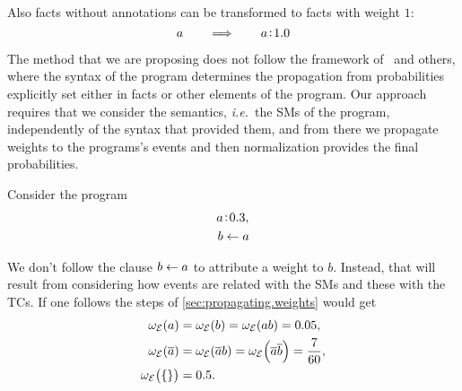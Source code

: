 \documentclass[x11names]{tlp}
\renewcommand{\cite}{\citep}
\begin{document}
Also facts without annotations can be transformed to facts with weight $1$:
\begin{equation}
	a \qquad \Longrightarrow \qquad a\!:\!1.0 \label{eq:noannotation}
\end{equation}

The method that we are proposing does not follow the framework of~\cite{kifer1992theory} and others, where the syntax of the program determines the propagation from probabilities explicitly set either in facts or other elements of the program.
Our approach requires that we consider the semantics, \emph{i.e.}\ the \aclp{SM} of the program, independently of the syntax that provided them, and from there we propagate weights to the programs's events and then normalization provides the final probabilities.
%


\ifExamples
	\begin{example}
		\label{example:not.syntax.propagation}
		\em

		Consider the program
		\begin{equation*}
			\begin{split}
				\weightfact{a & }{0.3},   %
				\\
				b           & \clause a
			\end{split}
		\end{equation*}

		We don't follow the clause $b \leftarrow a$ to attribute a weight to $b$.
		Instead, that will result from considering how events are related with the
		\aclp{SM} and these with the \aclp{TC}.		
		If one follows the steps of
		\cref{sec:propagating.weights} would get
		\begin{equation*}
			\begin{split}
				\wgtE\at{a}      & = \wgtE\at{b} = \wgtE\at{ab} = 0.05,                          %
				\\
				\wgtE\at{\co{a}} & = \wgtE\at{\co{a} b} = \wgtE\at{\co{a}\co{b}} = \frac{7}{60}, %
				\\
				\wgtE\at{\set{}} & = 0.5.                                                      %
				\\
			\end{split}
		\end{equation*}

	\end{example}
\fi
\end{document}

